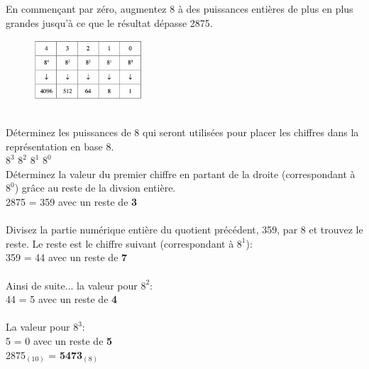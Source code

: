 \begin{Exercice}[20 minutes]
    En commençant par zéro, augmentez 8 à des puissances entières de plus en plus grandes jusqu'à ce que le résultat dépasse 2875.\\
    \begin{figure}[h]
        \includegraphics[width=0.36\textwidth]{img/6.3.2.png}
    \end{figure}\\
    Déterminez les puissances de 8 qui seront utilisées pour placer les chiffres dans la représentation en base 8.\\

    $8^3$   $8^2$   $8^1$   $8^0$ \\

    Déterminez la valeur du premier chiffre en partant de la droite (correspondant à $8^0$) grâce au reste de la divsion entière.\\
    2875\8 = 359 avec un reste de \textbf{3}\\\\
    Divisez la partie numérique entière du quotient précédent, 359, par 8 et trouvez le reste. Le reste est le chiffre suivant (correspondant à $8^1$):\\
    359\8 = 44 avec un reste de \textbf{7}\\\\
    Ainsi de suite... la valeur pour $8^2$:\\
    44\8 = 5 avec un reste de \textbf{4}\\\\
    La valeur pour $8^3$:\\
    5\8 = 0 avec un reste de \textbf{5}\\

    2875$_{(10)}$ = \textbf{5473$_{(8)}$}

\end{Exercice}


